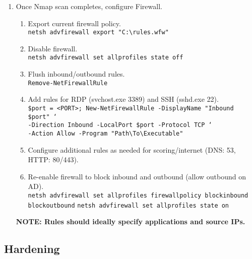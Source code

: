 \documentclass[12pt,letterpaper]{article}
\def\code#1{\textcolor{iris}{\texttt{#1}}}
\def\bf#1{\textbf{#1}}
\begin{document}
\begin{enumerate}
	\item Once Nmap scan completes, configure Firewall.
		\begin{enumerate}
			\item Export current firewall policy. \\
				\code{netsh advfirewall export "C:\textbackslash{}rules.wfw"}
			\item Disable firewall. \\
				\code{netsh advfirewall set allprofiles state off}
			\item Flush inbound/outbound rules. \\
				\code{Remove-NetFirewallRule}
			\item Add rules for RDP (svchost.exe 3389) and SSH (sshd.exe 22). \\
			\code{\$port = <PORT>; New-NetFirewallRule -DisplayName "Inbound \$port" ` \\
			-Direction Inbound -LocalPort \$port -Protocol TCP ` \\
			-Action Allow -Program "Path\textbackslash{}To\textbackslash{}Executable"}
			\item Configure additional rules as needed for scoring/internet (DNS: 53, HTTP: 80/443).
			\item Re-enable firewall to block inbound and outbound (allow outbound on AD). \\
				\code{netsh advfirewall set allprofiles firewallpolicy blockinbound blockoutbound}
				\code{netsh advfirewall set allprofiles state on}
		\end{enumerate}
	\bf{NOTE: Rules should ideally specify applications and source IPs.}
\end{enumerate}

\subsection{Hardening}
\end{document}
